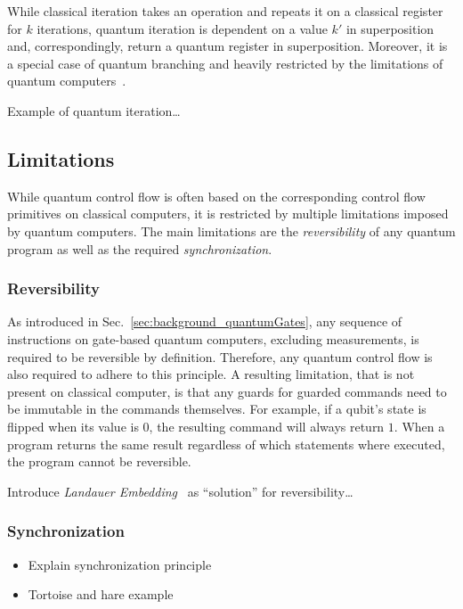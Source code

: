 While classical iteration takes an operation and repeats it on a classical register for $k$ iterations, quantum iteration is dependent on a value $k'$ in superposition and, correspondingly, return a quantum register in superposition. Moreover, it is a special case of quantum branching and heavily restricted by the limitations of quantum computers~\cite{YVC24}.    

Example of quantum iteration\dots

\subsection{Limitations}	
While quantum control flow is often based on the corresponding control flow primitives on classical computers, it is restricted by multiple limitations imposed by quantum computers. The main limitations are the \emph{reversibility} of any quantum program as well as the required \emph{synchronization}.

\subsubsection{Reversibility}
As introduced in Sec.~\ref{sec:background_quantumGates}, any sequence of instructions on gate-based quantum computers, excluding measurements, is required to be reversible by definition. Therefore, any quantum control flow is also required to adhere to this principle. A resulting limitation, that is not present on classical computer, is that any guards for guarded commands need to be immutable in the commands themselves. For example, if a qubit's state is flipped when its value is $0$, the resulting command will always return $1$. When a program returns the same result regardless of which statements where executed, the program cannot be reversible.   

Introduce \emph{Landauer Embedding}~\cite{Land61} as ``solution'' for reversibility\dots

\subsubsection{Synchronization}
\begin{itemize}
    \item Explain synchronization principle
    \item Tortoise and hare example
\end{itemize}